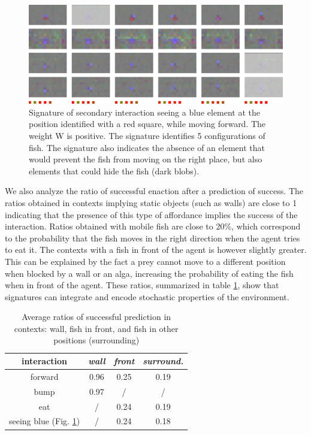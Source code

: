 \documentclass[conference]{IEEEtran}
\begin{document}
\begin{figure}[t]
\centerline{\includegraphics[scale=0.32]{img/sig_blue.pdf}}
\caption{Signature of secondary interaction seeing a blue element at the position identified with a red square, while moving forward. The weight W is positive. The signature identifies 5 configurations of fish. The signature also indicates the absence of an element that would prevent the fish from moving on the right place, but also elements that could hide the fish (dark blobs).}
\label{fig:sigblue}
\end{figure}


We also analyze the ratio of successful enaction after a prediction of success. 
The ratios obtained in contexts implying static objects (such as walls) are close to 1 indicating that the presence of this type of affordance implies the success of the interaction. 
Ratios obtained with mobile fish are close to 20\%, which correspond to the probability that the fish moves in the right direction when the agent tries to eat it. 
The contexts with a fish in front of the agent is however slightly greater. 
This can be explained by the fact a prey cannot move to a different position when blocked by a wall or an alga, increasing the probability of eating the fish when in front of the agent. 
These ratios, summarized in table \ref{tab1}, show that signatures can integrate and encode stochastic properties of the environment.


\begin{table}[htbp]
\caption{Average ratios of successful prediction in contexts: wall, fish in front, and fish in other positions (surrounding)}
\begin{center}
\begin{tabular}{|c|c|c|c|}
\hline
\textbf{interaction} & \textbf{\textit{wall}}& \textbf{\textit{front}} & \textbf{\textit{surround.}}\\
\hline
forward & 0.96 & 0.25 & 0.19 \\
\hline
bump    & 0.97 & /    &  / \\
\hline
eat & / & 0.24 & 0.19 \\
\hline
seeing blue (Fig. \ref{fig:sigblue}) & / & 0.24 & 0.18 \\
\hline
\end{tabular}
\label{tab1}
\end{center}
\end{table}
\end{document}

